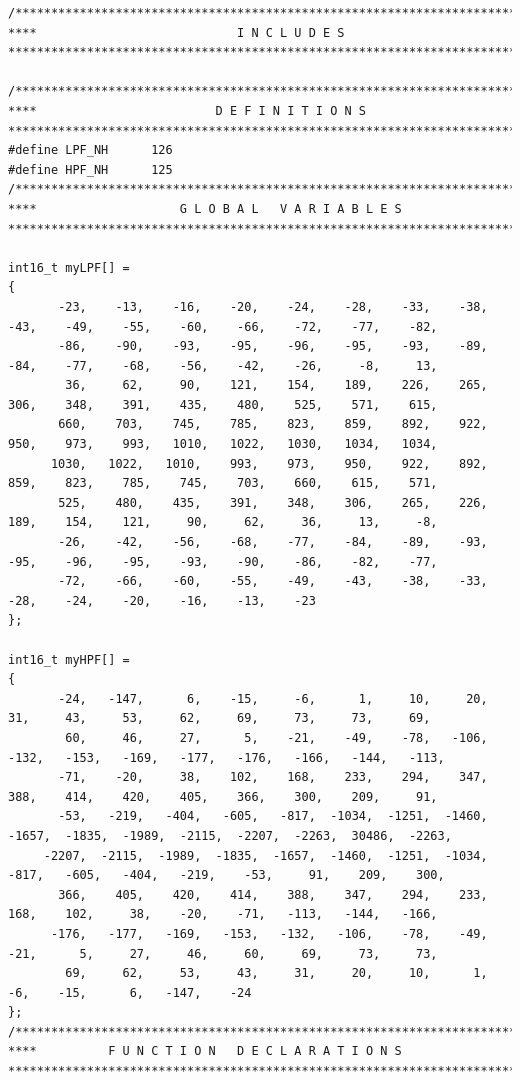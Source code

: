 \documentclass[11pt,pdftex,portrait,letterpaper]{article}
\begin{document}
\begin{lstlisting}[caption={filters.h}, label=l:programxxx]
/*******************************************************************************
****                            I N C L U D E S
*******************************************************************************/

/*******************************************************************************
****                         D E F I N I T I O N S
*******************************************************************************/
#define LPF_NH		126
#define HPF_NH		125
/*******************************************************************************
****                    G L O B A L   V A R I A B L E S
*******************************************************************************/

int16_t myLPF[] =
{
       -23,    -13,    -16,    -20,    -24,    -28,    -33,    -38,    -43,    -49,    -55,    -60,    -66,    -72,    -77,    -82,
       -86,    -90,    -93,    -95,    -96,    -95,    -93,    -89,    -84,    -77,    -68,    -56,    -42,    -26,     -8,     13,
        36,     62,     90,    121,    154,    189,    226,    265,    306,    348,    391,    435,    480,    525,    571,    615,
       660,    703,    745,    785,    823,    859,    892,    922,    950,    973,    993,   1010,   1022,   1030,   1034,   1034,
      1030,   1022,   1010,    993,    973,    950,    922,    892,    859,    823,    785,    745,    703,    660,    615,    571,
       525,    480,    435,    391,    348,    306,    265,    226,    189,    154,    121,     90,     62,     36,     13,     -8,
       -26,    -42,    -56,    -68,    -77,    -84,    -89,    -93,    -95,    -96,    -95,    -93,    -90,    -86,    -82,    -77,
       -72,    -66,    -60,    -55,    -49,    -43,    -38,    -33,    -28,    -24,    -20,    -16,    -13,    -23
};

int16_t myHPF[] =
{
       -24,   -147,      6,    -15,     -6,      1,     10,     20,     31,     43,     53,     62,     69,     73,     73,     69,
        60,     46,     27,      5,    -21,    -49,    -78,   -106,   -132,   -153,   -169,   -177,   -176,   -166,   -144,   -113,
       -71,    -20,     38,    102,    168,    233,    294,    347,    388,    414,    420,    405,    366,    300,    209,     91,
       -53,   -219,   -404,   -605,   -817,  -1034,  -1251,  -1460,  -1657,  -1835,  -1989,  -2115,  -2207,  -2263,  30486,  -2263,
     -2207,  -2115,  -1989,  -1835,  -1657,  -1460,  -1251,  -1034,   -817,   -605,   -404,   -219,    -53,     91,    209,    300,
       366,    405,    420,    414,    388,    347,    294,    233,    168,    102,     38,    -20,    -71,   -113,   -144,   -166,
      -176,   -177,   -169,   -153,   -132,   -106,    -78,    -49,    -21,      5,     27,     46,     60,     69,     73,     73,
        69,     62,     53,     43,     31,     20,     10,      1,     -6,    -15,      6,   -147,    -24
};
/*******************************************************************************
****          F U N C T I O N   D E C L A R A T I O N S
*******************************************************************************/

\end{lstlisting}
\pagebreak
\end{document}
